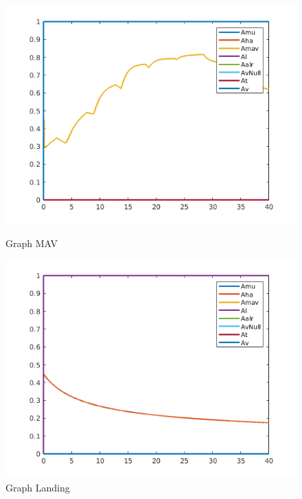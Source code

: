 \documentclass{article}
\begin{document}
\begin{figure}[!h]
    \centering
    \begin{minipage}{0.50\textwidth}
    \includegraphics[scale=0.5]{213_MAV_A.png}
    \caption{Graph MAV}
    \label{213}
    \end{minipage}
\hfill
    \centering
    \begin{minipage}{0.50\textwidth}
    \includegraphics[scale=0.5]{213_Landing_A.png}
    \caption{Graph Landing}
    \end{minipage}
\end{figure}

\clearpage
\end{document}
